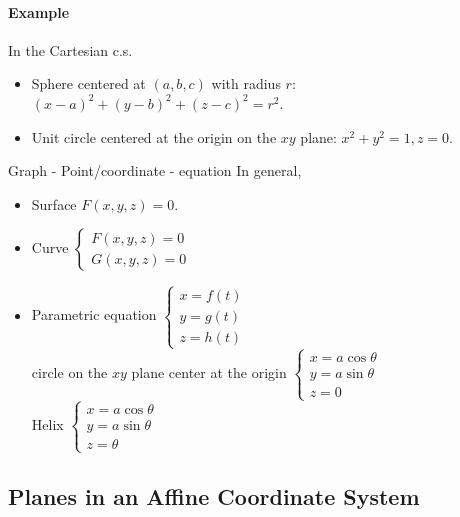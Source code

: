 \documentclass[UTF8]{ctexart}
\begin{document}
\paragraph{Example}
In the Cartesian c.s.
\begin{itemize} 
  \item Sphere centered at $(a,b,c)$ with radius $r$: $(x-a)^2+(y-b)^2+(z-c)^2=r^2$.
  \item Unit circle centered at the origin on the $xy$ plane: $x^2+y^2=1,z=0$.
\end{itemize}
Graph - Point/coordinate - equation
In general,
\begin{itemize}
  \item Surface $F(x,y,z)=0$.
  \item Curve 
  $\left\{\begin{array}{l}
    F(x, y, z)=0 \\
    G(x, y, z)=0
    \end{array}\right.$
  \item Parametric equation 
    $\left\{\begin{array}{l}
    x=f(t) \\
    y=g(t) \\
    z=h(t)
    \end{array}\right.
  $\\
  circle on the $xy$ plane center at the origin
  $\left\{\begin{array}{l}
    x=a\cos \theta \\
    y=a \sin \theta\\
    z=0
    \end{array}\right.
  $\\
  Helix
  $\left\{\begin{array}{l}
    x=a\cos \theta \\
    y=a \sin \theta\\
    z=\theta
    \end{array}\right.
  $\\
\end{itemize}
\subsection{Planes in an Affine Coordinate System}
\end{document}
